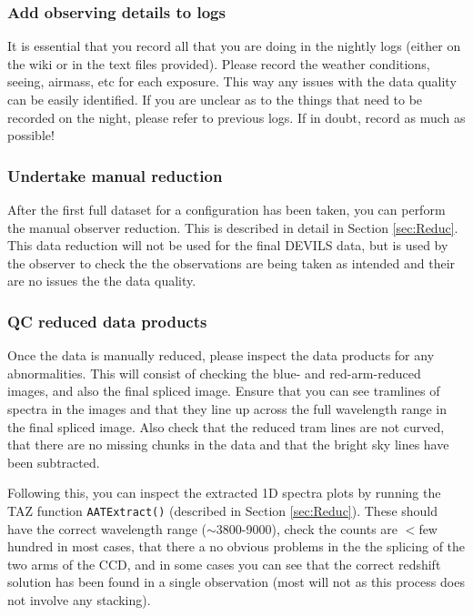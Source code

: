 \documentclass[12pt]{article}
\begin{document}
\subsubsection{Add observing details to logs}

It is essential that you record all that you are doing in the nightly logs (either on the wiki or in the text files provided). Please record the weather conditions, seeing, airmass, etc for each exposure. This way any issues with the data quality can be easily identified. If you are unclear as to the things that need to be recorded on the night, please refer to previous logs. If in doubt, record as much as possible! 


\subsubsection{Undertake manual reduction}

After the first full dataset for a configuration has been taken, you can perform the manual observer reduction. This is described in detail in Section \ref{sec:Reduc}. This data reduction will not be used for the final DEVILS data, but is used by the observer to check the the observations are being taken as intended and their are no issues the the data quality.  

\subsubsection{QC reduced data products}

Once the data is manually reduced, please inspect the data products for any abnormalities. This will consist of checking the blue- and red-arm-reduced images, and also the final spliced image. Ensure that you can see tramlines of spectra in the images and that they line up across the full wavelength range in the final spliced image. Also check that the reduced tram lines are not curved, that there are no missing chunks in the data and that the bright sky lines have been subtracted. 

Following this, you can inspect the extracted 1D spectra plots by running the TAZ function \texttt{AATExtract()} (described in Section \ref{sec:Reduc}). These should have the correct wavelength range ($\sim$3800-9000), check the counts are $<$few hundred in most cases, that there a no obvious problems in the the splicing of the two arms of the CCD, and in some cases you can see that the correct redshift solution has been found in a single observation (most will not as this process does not involve any stacking).
\end{document}
